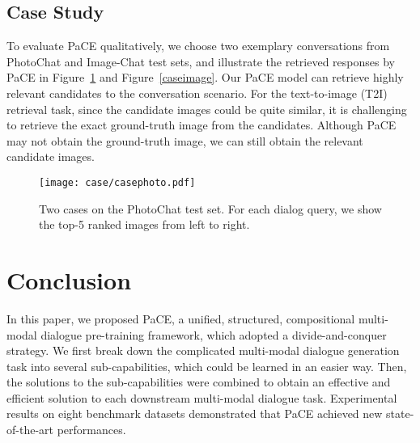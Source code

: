 \documentclass[11pt]{article}
\begin{document}
\begin{table}[h]
    \centering
    \caption{
    Ablation test results on the multi-modal dialog retrieval task by using different  pre-training data.
    }
    \label{tab:ab-data}
\end{table}

\subsection{Case Study}
To evaluate PaCE qualitatively, we choose two exemplary conversations from PhotoChat and Image-Chat test sets, and illustrate the retrieved responses by PaCE in Figure~\ref{casephotochat1} and Figure~\ref{caseimage}. Our PaCE model can retrieve highly relevant candidates to the conversation scenario. For the text-to-image (T2I) retrieval task, since the candidate images could be quite similar, it is challenging to retrieve the exact ground-truth image from the candidates. Although PaCE may not obtain the ground-truth image, we can still obtain the relevant candidate images.  

\begin{figure}[t]
    \small
    \centering
    \texttt{[image: case/casephoto.pdf]}
    \caption{Two cases on the PhotoChat test set. For each dialog query, we show the top-5 ranked images from left to right.}
    \label{casephotochat1}
\end{figure}

\vspace{4mm}
\section{Conclusion}
In this paper, we proposed PaCE, a unified, structured, compositional multi-modal dialogue pre-training framework, which adopted a divide-and-conquer strategy. We first break down the complicated multi-modal dialogue generation task into several sub-capabilities, which could be learned in an easier way. Then, the solutions to the sub-capabilities were combined to obtain an effective and efficient solution to each downstream multi-modal dialogue task. Experimental results on eight benchmark datasets demonstrated that PaCE achieved new state-of-the-art performances.
\end{document}
